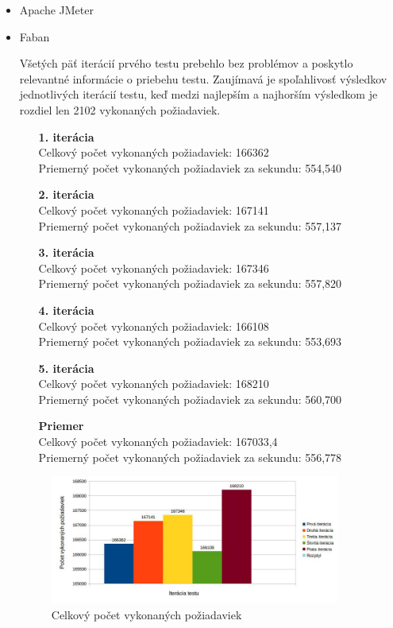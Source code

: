 \documentclass[12pt,oneside,final]{fithesis-utf8}
\begin{document}
\begin{itemize}

\item Apache JMeter

\item Faban

Všetých päť iterácií prvého testu prebehlo bez problémov a poskytlo relevantné informácie o priebehu testu. Zaujímavá je spoľahlivosť výsledkov jednotlivých iterácií testu, keď medzi najlepším a najhorším výsledkom je rozdiel len 2102 vykonaných požiadaviek.

\begin{itemize}

\item[\textbf{1. iterácia}]\ \\
Celkový počet vykonaných požiadaviek: 166362\\
Priemerný počet vykonaných požiadaviek za sekundu: 554,540

\item[\textbf{2. iterácia}]\ \\
Celkový počet vykonaných požiadaviek: 167141\\
Priemerný počet vykonaných požiadaviek za sekundu: 557,137

\item[\textbf{3. iterácia}]\ \\
Celkový počet vykonaných požiadaviek: 167346\\
Priemerný počet vykonaných požiadaviek za sekundu: 557,820

\item[\textbf{4. iterácia}]\ \\
Celkový počet vykonaných požiadaviek: 166108\\
Priemerný počet vykonaných požiadaviek za sekundu: 553,693

\item[\textbf{5. iterácia}]\ \\
Celkový počet vykonaných požiadaviek: 168210\\
Priemerný počet vykonaných požiadaviek za sekundu: 560,700

\item[\textbf{Priemer}]\ \\
Celkový počet vykonaných požiadaviek: 167033,4\\
Priemerný počet vykonaných požiadaviek za sekundu: 556,778

\end{itemize}

\begin{figure}[H]
  \centering
      \includegraphics[width=0.9\textwidth]{faban1.jpg}
  \caption{Celkový počet vykonaných požiadaviek}
\end{figure}


\end{itemize}
\end{document}
